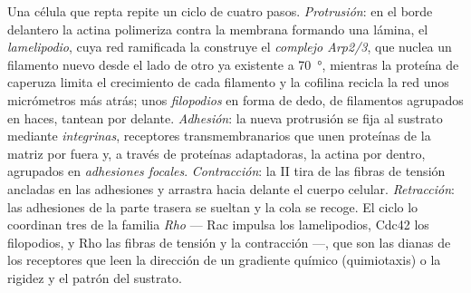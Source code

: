 \begin{definition}\label{def:b3:cytoskeleton-motility:migration}
Una célula que repta repite un ciclo de cuatro pasos. \emph{Protrusión}:
en el borde delantero la actina polimeriza contra la membrana formando
una lámina, el \emph{lamelipodio}, cuya red ramificada la construye el
\emph{complejo Arp2/3}, que nuclea un filamento nuevo desde el lado de
otro ya existente a \qty{70}{\degree}, mientras la proteína de caperuza
limita el crecimiento de cada filamento y la cofilina recicla la red unos
micrómetros más atrás; unos \emph{filopodios} en forma de dedo, de
filamentos agrupados en haces, tantean por delante. \emph{Adhesión}: la
nueva protrusión se fija al sustrato mediante \emph{integrinas},
receptores transmembranarios que unen proteínas de la matriz por fuera y,
a través de proteínas adaptadoras, la actina por dentro, agrupados en
\emph{adhesiones focales}. \emph{Contracción}: la  II tira de las
fibras de tensión ancladas en las adhesiones y arrastra hacia delante el
cuerpo celular. \emph{Retracción}: las adhesiones de la parte trasera se
sueltan y la cola se recoge. El ciclo lo coordinan tres 
de la familia \emph{Rho} --- Rac impulsa los lamelipodios, Cdc42 los
filopodios, y Rho las fibras de tensión y la contracción ---, que son las
dianas de los receptores que leen la dirección de un gradiente químico
(quimiotaxis) o la rigidez y el patrón del sustrato.
\end{definition}

